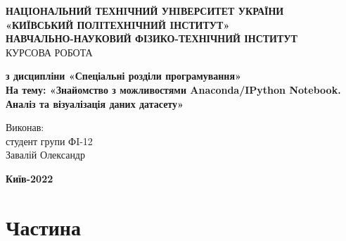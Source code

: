 \documentclass[a4paper,12pt]{article}
\begin{document}
\begin{center}
    \hfill \break
    \large{\textbf{НАЦIОНАЛЬНИЙ ТЕХНIЧНИЙ УНIВЕРСИТЕТ УКРАЇНИ\\
            «КИЇВСЬКИЙ ПОЛIТЕХНIЧНИЙ IНСТИТУТ»\\
            НАВЧАЛЬНО-НАУКОВИЙ ФІЗИКО-ТЕХНІЧНИЙ ІНСТИТУТ}}\\
    \hfill \break \hfill \break \hfill\break \hfill \break \hfill \break \hfill \break \hfill \break
    \hfill \break \hfill \break
    \large{КУРСОВА РОБОТА}
    \begin{center}
        \normalsize{\textbf{з дисципліни «Спеціальні розділи програмування» \\
        На тему: «Знайомство з можливостями Anaconda/IPython Notebook. \\
        Аналіз та візуалізація даних датасету» \\}}
    \end{center}
\end{center}
\hfill \break \hfill \break \hfill \break \hfill \break \hfill \break \hfill \break \hfill \break
\hfill \break \hfill \break \hfill \break \hfill \break \hfill \break \hfill \break 
\begin{flushright}
    \large{ \hspace{35pt} Виконав:\\
        студент групи ФI-12\\
        Завалій Олександр} 
\end{flushright}
\hfill \break \hfill \break \hfill \break \hfill \break \hfill \break \hfill \break \hfill \break
\hfill \break \hfill \break 
\begin{center} \textbf{Київ-2022} \end{center}
\thispagestyle{empty}

\newpage
    \renewcommand*\contentsname{Contents}
    \tableofcontents

\newpage
    \section {Частина}
\end{document}
